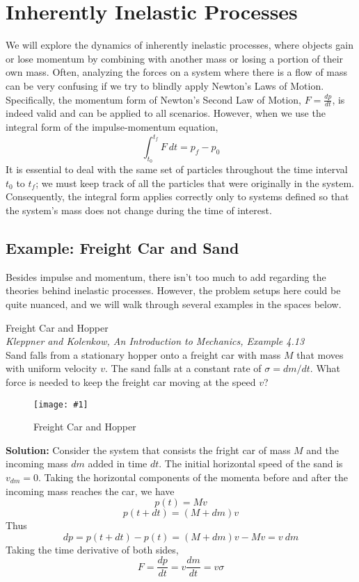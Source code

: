 \documentclass[11pt]{article}
\newcommand{\fig}[4]{
    \begin{figure}[H]
        \centering
        \texttt{[image: \#1]}
        \caption{#2}
        \label{exp4fit}
    \end{figure}
}
\theoremstyle{gangnamstyle}{\newtheorem{definition}{Definition}[]}
\theoremstyle{gangnamstyle}{\newtheorem{example}{Example}[]}
\theoremstyle{gangnamstyle}{\newtheorem{problem}{Problem}[]}
\theoremstyle{gangnamstyle}{\newtheorem{warning}{Warning}[]}
\begin{document}
\pagebreak

\section{Inherently Inelastic Processes}

We will explore the dynamics of inherently inelastic processes, where objects gain or lose momentum by combining with another mass or losing a portion of their own mass. Often, analyzing the forces on a system where there is a flow of mass can be very confusing if we try to blindly apply Newton's Laws of Motion. \\
Specifically, the momentum form of Newton's Second Law of Motion, $F = \frac{dp}{dt}$, is indeed valid and can be applied to all scenarios. However, when we use the integral form of the impulse-momentum equation, 
\[ \int_{t_0}^{t_f} F \ dt = p_f - p_0 \]
It is essential to deal with the same set of particles throughout the
time interval $t_0$ to $t_f$; we must keep track of all the particles that
were originally in the system. Consequently, the integral form applies
correctly only to systems defined so that the system’s mass does not
change during the time of interest. 

\subsection{Example: Freight Car and Sand}

Besides impulse and momentum, there isn't too much to add regarding the theories behind inelastic processes. However, the problem setups here could be quite nuanced, and we will walk through several examples in the spaces below. 

\begin{example}
Freight Car and Hopper \\
\textit{Kleppner and Kolenkow, An Introduction to Mechanics, Example 4.13} \\
Sand falls from a stationary hopper onto a freight car with mass $M$ that moves with uniform velocity $v$. The sand falls at a constant rate of $\sigma = dm/dt$. What force is needed to keep the freight car moving at the speed $v$? \\
\fig{figs/n4/hopper.png}{Freight Car and Hopper}{0.3}{0}

\textbf{Solution:} Consider the system that consists the fright car of mass $M$ and the incoming mass $dm$ added in time $dt$. The initial horizontal speed of the sand is $v_{dm} = 0$. Taking the horizontal components of the momenta before and after the incoming mass reaches the car, we have
\[ p(t) = Mv \]
\[ p(t + dt) = (M + dm)v \]
Thus
\[ dp = p(t + dt) - p(t) = (M + dm)v - Mv = v \ dm \]
Taking the time derivative of both sides, 
\[ F = \frac{dp}{dt} = v\frac{dm}{dt} = v\sigma \]
\end{example}
\end{document}
